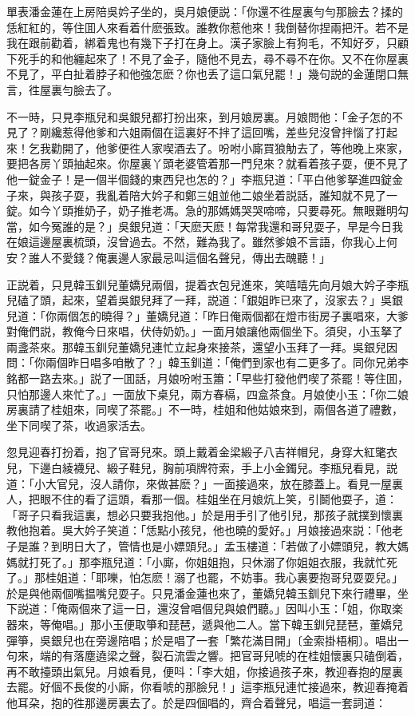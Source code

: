 單表潘金蓮在上房陪吳妗子坐的，吳月娘便説：「你還不徃屋裏勻勻那臉去？揉的恁紅紅的，等住囬人來看着什麽張致。誰教你惹他來！我倒替你捏兩把汗。若不是我在跟前勸着，綁着鬼也有幾下子打在身上。漢子家臉上有狗毛，不知好歹，只顧下死手的和他纏起來了！不見了金子，隨他不見去，尋不尋不在你。又不在你屋裏不見了，平白扯着脖子和他強怎麽？你也丢了這口氣兒罷！」幾句説的金蓮閉口無言，徃屋裏勻臉去了。

不一時，只見李瓶兒和吳銀兒都打扮出來，到月娘房裏。月娘問他：「金子怎的不見了？剛纔惹得他爹和六姐兩個在這裏好不拌了這回嘴，差些兒沒曾拌惱了打起來！乞我勸開了，他爹便徃人家喫酒去了。吩咐小廝買狼觔去了，等他晚上來家，要把各房丫頭抽起來。你屋裏丫頭老婆管着那一門兒來？就看着孩子耍，便不見了他一錠金子！是一個半個錢的東西兒也怎的？」李瓶兒道：「平白他爹拏進四錠金子來，與孩子耍，我亂着陪大妗子和鄭三姐並他二娘坐着説話，誰知就不見了一錠。如今丫頭推奶子，奶子推老馮。急的那媽媽哭哭啼啼，只要尋死。無眼難明勾當，如今冤誰的是？」吳銀兒道：「天麽天麽！每常我還和哥兒耍子，早是今日我在娘這邊屋裏梳頭，沒曾過去。不然，難為我了。雖然爹娘不言語，你我心上何安？誰人不愛錢？俺裏邊人家最忌叫這個名聲兒，傳出去醜聽！」

正説着，只見韓玉釧兒董嬌兒兩個，提着衣包兒進來，笑嘻嘻先向月娘大妗子李瓶兒磕了頭，起來，望着吳銀兒拜了一拜，説道：「銀姐昨已來了，沒家去？」吳銀兒道：「你兩個怎的曉得？」董嬌兒道：「昨日俺兩個都在燈巿街房子裏唱來，大爹對俺們説，教俺今日來唱，伏侍奶奶。」一面月娘讓他兩個坐下。須臾，小玉拏了兩盞茶來。那韓玉釧兒董嬌兒連忙立起身來接茶，還望小玉拜了一拜。吳銀兒因問：「你兩個昨日唱多咱散了？」韓玉釧道：「俺們到家也有二更多了。同你兄弟李銘都一路去來。」説了一囬話，月娘吩咐玉簫：「早些打發他們喫了茶罷！等住囬，只怕那邊人來忙了。」一面放下桌兒，兩方春槅，四盒茶食。月娘使小玉：「你二娘房裏請了桂姐來，同喫了茶罷。」不一時，桂姐和他姑娘來到，兩個各道了禮數，坐下同喫了茶，收過家活去。

忽見迎春打扮着，抱了官哥兒來。頭上戴着金梁緞子八吉祥帽兒，身穿大紅氅衣兒，下邊白綾襪兒、緞子鞋兒，胸前項牌符索，手上小金鐲兒。李瓶兒看見，説道：「小大官兒，沒人請你，來做甚麽？」一面接過來，放在膝蓋上。看見一屋裏人，把眼不住的看了這頭，看那一個。桂姐坐在月娘炕上笑，引鬬他耍子，道：「哥子只看我這裏，想必只要我抱他。」於是用手引了他引兒，那孩子就撲到懷裏教他抱着。吳大妗子笑道：「恁點小孩兒，他也曉的愛好。」月娘接過來説：「他老子是誰？到明日大了，管情也是小嫖頭兒。」孟玉樓道：「若做了小嫖頭兒，教大媽媽就打死了。」那李瓶兒道：「小廝，你姐姐抱，只休溺了你姐姐衣服，我就忙死了。」那桂姐道：「耶嚛，怕怎麽！溺了也罷，不妨事。我心裏要抱哥兒耍耍兒。」於是與他兩個嘴揾嘴兒耍子。只見潘金蓮也來了，董嬌兒韓玉釧兒下來行禮畢，坐下説道：「俺兩個來了這一日，還沒曾唱個兒與娘們聽。」因叫小玉：「姐，你取楽器來，等俺唱。」那小玉便取箏和琵琶，遞與他二人。當下韓玉釧兒琵琶，董嬌兒彈箏，吳銀兒也在旁邊陪唱；於是唱了一套「繁花滿目開」〔金索掛梧桐〕。唱出一句來，端的有落塵遶梁之聲，裂石流雲之響。把官哥兒唬的在桂姐懷裏只磕倒着，再不敢擡頭出氣兒。月娘看見，便呌：「李大姐，你接過孩子來，教迎春抱的屋裏去罷。好個不長俊的小廝，你看唬的那臉兒！」這李瓶兒連忙接過來，教迎春掩着他耳朶，抱的徃那邊房裏去了。於是四個唱的，齊合着聲兒，唱這一套詞道：

